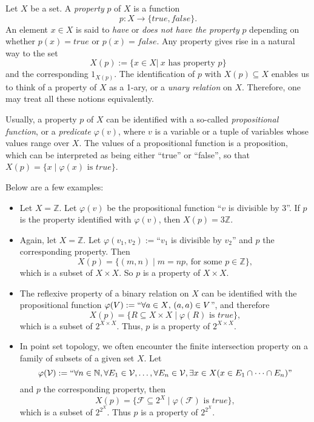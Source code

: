 \documentclass[12pt]{article}
\begin{document}
Let $X$ be a set.  A \emph{property} $p$ of $X$ is a function $$p\colon X\to \{\mathit{true},\mathit{false}\}.$$  An element $x\in X$ is said to \emph{have} or \emph{does not have the property} $p$ depending on whether $p(x)=\mathit{true}$ or $p(x)=\mathit{false}$.  Any property gives rise in a natural way to the set $$X(p):=\lbrace x\in X | \ x\text{ has property }p\rbrace$$ and the corresponding  $1_{X(p)}$.  The identification of $p$ with $X(p)\subseteq X$ enables us to think of a property of $X$ as a 1-ary, or a \emph{unary relation} on $X$.  Therefore, one may treat all these notions equivalently.

Usually, a property $p$ of $X$ can be identified with a so-called \emph{propositional function}, or a \emph{predicate} $\varphi(v)$, where $v$ is a variable or a tuple of variables whose values range over $X$.  The values of a propositional function is a proposition, which can be interpreted as being either ``true'' or ``false'', so that $X(p)=\lbrace x \mid \varphi(x)\mbox{ is }\mathit{true}\rbrace$.

Below are a few examples:
\begin{itemize}
\item
Let $X=\mathbb{Z}$.  Let $\varphi(v)$ be the propositional function ``$v$ is divisible by $3$''.  If $p$ is the property identified with $\varphi(v)$, then $X(p)=3\mathbb{Z}$.  
\item
Again, let $X=\mathbb{Z}$.  Let $\varphi(v_1,v_2):=$``$v_1$ is divisible by $v_2$'' and $p$ the corresponding property.  Then $$X(p)=\lbrace (m,n)\mid m=np\mbox{, for some }p\in \mathbb{Z}\rbrace,$$ which is a subset of $X\times X$.  So $p$ is a property of $X\times X$.  
\item
The reflexive property of a binary relation on $X$ can be identified with the propositional function $\varphi(V):=``\forall a\in X\mbox{, }(a,a)\in V$'', and therefore $$X(p)=\lbrace R\subseteq X\times X\mid \varphi(R)\mbox{ is }\mathit{true}\rbrace,$$ which is a subset of $2^{X\times X}$.  Thus, $p$ is a property of $2^{X\times X}$.
\item
In point set topology, we often encounter the finite intersection property on a family of subsets of a given set $X$.  Let $$\varphi(\mathcal{V}):=``\forall n\in \mathbb{N}, \forall E_1\in \mathcal{V},\ldots,\forall E_n\in \mathcal{V}, \exists x\in X (x\in E_1\cap \cdots \cap E_n)\mbox{''}$$
and $p$ the corresponding property, then $$X(p)=\lbrace \mathcal{F} \subseteq 2^X\mid \varphi(\mathcal{F})\mbox{ is }\mathit{true}\rbrace,$$ which is a subset of $2^{2^X}$.  Thus $p$ is a property of $2^{2^X}$.
\end{itemize}
\end{document}
